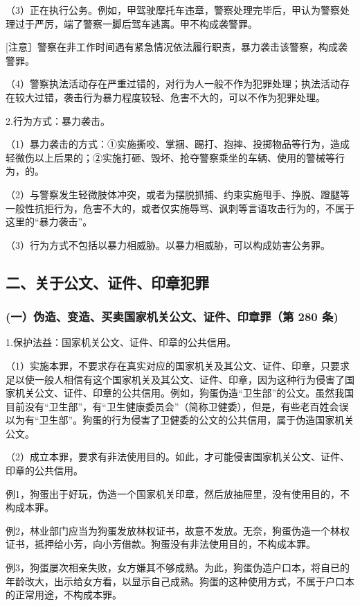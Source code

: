 （3）正在执行公务。例如，甲驾驶摩托车违章，警察处理完毕后，甲认为警察处理过于严厉，端了警察一脚后驾车逃离。甲不构成袭警罪。

[注意］警察在非工作时间遇有紧急情况依法履行职责，暴力袭击该警察，构成袭警罪。

（4）警察执法活动存在严重过错的，对行为人一般不作为犯罪处理；执法活动存在较大过错，袭击行为暴力程度较轻、危害不大的，可以不作为犯罪处理。

2.行为方式：暴力袭击。

（1）暴力袭击的方式：①实施撕咬、掌捆、踢打、抱摔、投掷物品等行为，造成轻微伤以上后果的；②实施打砸、毁坏、抢夺警察乘坐的车辆、使用的警械等行为，的。

（2）与警察发生轻微肢体冲突，或者为摆脱抓捕、约束实施甩手、挣脱、蹬腿等一般性抗拒行为，危害不大的，或者仅实施辱骂、讽刺等言语攻击行为的，不属于这里的“暴力袭击”。

（3）行为方式不包括以暴力相威胁。以暴力相威胁，可以构成妨害公务罪。

\subsection*{二、关于公文、证件、印章犯罪}

\subsubsection*{(一）伪造、变造、买卖国家机关公文、证件、印章罪（第 280 条)}

1.保护法益：国家机关公文、证件、印章的公共信用。

（1）实施本罪，不要求存在真实对应的国家机关及其公文、证件、印章，只要求足以使一般人相信有这个国家机关及其公文、证件、印章，因为这种行为侵害了国家机关公文、证件、印章的公共信用。例如，狗蛋伪造“卫生部”的公文。虽然我国目前没有“卫生部”，有“卫生健康委员会”（简称卫健委），但是，有些老百姓会误以为有“卫生部”。狗蛋的行为侵害了卫健委的公文的公共信用，属于伪造国家机关公文。

（2）成立本罪，要求有非法使用目的。如此，才可能侵害国家机关公文、证件、印章的公共信用。

例1，狗蛋出于好玩，伪造一个国家机关印章，然后放抽屉里，没有使用目的，不构成本罪。

例2，林业部门应当为狗蛋发放林权证书，故意不发放。无奈，狗蛋伪造一个林权证书，抵押给小芳，向小芳借款。狗蛋没有非法使用目的，不构成本罪。

例3，狗蛋屡次相亲失败，女方嫌其不够成熟。为此，狗蛋伪造户口本，将自已的年龄改大，出示给女方看，以显示自己成熟。狗蛋的这种使用方式，不属于户口本的正常用途，不构成本罪。

